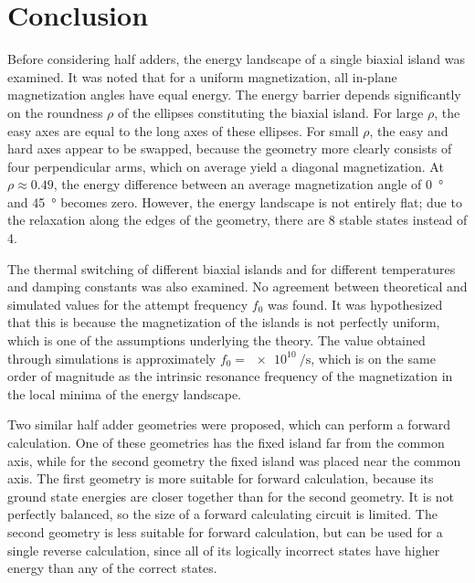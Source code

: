 \documentclass[twocolumn]{phdsymp}
\begin{document}
\section{Conclusion}
Before considering half adders, the energy landscape of a single biaxial island was examined. It was noted that for a uniform magnetization, all in-plane magnetization angles have equal energy. The energy barrier depends significantly on the roundness $\rho$ of the ellipses constituting the biaxial island. For large $\rho$, the easy axes are equal to the long axes of these ellipses. For small $\rho$, the easy and hard axes appear to be swapped, because the geometry more clearly consists of four perpendicular arms, which on average yield a diagonal magnetization. At $\rho \approx 0.49$, the energy difference between an average magnetization angle of \SI{0}{\degree} and \SI{45}{\degree} becomes zero. However, the energy landscape is not entirely flat; due to the relaxation along the edges of the geometry, there are 8 stable states instead of 4. \par
The thermal switching of different biaxial islands and for different temperatures and damping constants was also examined. No agreement between theoretical and simulated values for the attempt frequency $f_0$ was found. It was hypothesized that this is because the magnetization of the islands is not perfectly uniform, which is one of the assumptions underlying the theory. The value obtained through simulations is approximately $f_0=\SI{e10}{\per\second}$, which is on the same order of magnitude as the intrinsic resonance frequency of the magnetization in the local minima of the energy landscape. \par
Two similar half adder geometries were proposed, which can perform a forward calculation. One of these geometries has the fixed island far from the common axis, while for the second geometry the fixed island was placed near the common axis. The first geometry is more suitable for forward calculation, because its ground state energies are closer together than for the second geometry. It is not perfectly balanced, so the size of a forward calculating circuit is limited. The second geometry is less suitable for forward calculation, but can be used for a single reverse calculation, since all of its logically incorrect states have higher energy than any of the correct states.


\nocite{*}


\end{document}
